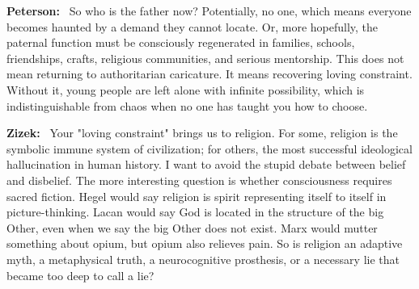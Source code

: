 \documentclass[a4paper,11pt]{article}
\newenvironment{question}{\par\noindent\color{ALIUSRed}\textbf{Zizek:}\ }{\par}
\newenvironment{answer}{\par\noindent\color{black}\textbf{Peterson:}\ }{\par}
\begin{document}
\begin{answer}
So who is the father now? Potentially, no one, which means everyone becomes haunted by a demand they cannot locate. Or, more hopefully, the paternal function must be consciously regenerated in families, schools, friendships, crafts, religious communities, and serious mentorship. This does not mean returning to authoritarian caricature. It means recovering loving constraint. Without it, young people are left alone with infinite possibility, which is indistinguishable from chaos when no one has taught you how to choose.
\end{answer}

\begin{question}
Your "loving constraint" brings us to religion. For some, religion is the symbolic immune system of civilization; for others, the most successful ideological hallucination in human history. I want to avoid the stupid debate between belief and disbelief. The more interesting question is whether consciousness requires sacred fiction. Hegel would say religion is spirit representing itself to itself in picture-thinking. Lacan would say God is located in the structure of the big Other, even when we say the big Other does not exist. Marx would mutter something about opium, but opium also relieves pain. So is religion an adaptive myth, a metaphysical truth, a neurocognitive prosthesis, or a necessary lie that became too deep to call a lie?
\end{question}
\end{document}
